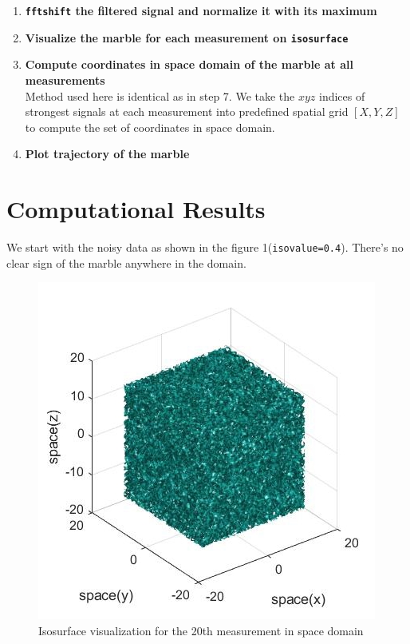 \documentclass[11pt,a4paper]{article}
\numberwithin{equation}{subsection}
\begin{document}
\begin{enumerate}
		\item \textbf{\texttt{fftshift} the filtered signal and normalize it with its maximum}
		
		\item \textbf{Visualize the marble for each measurement on \texttt{isosurface}}
		
		\item \textbf{Compute coordinates in space domain of the marble at all measurements}
		\\ Method used here is identical as in step 7. We take the $xyz$ indices of strongest signals at each measurement into predefined spatial grid $[X, Y, Z]$ to compute the set of coordinates in space domain.
		
		\item \textbf{Plot trajectory of the marble}
	\end{enumerate}


\section{Computational Results}
We start with the noisy data as shown in the figure 1(\texttt{isovalue=0.4}). There's no clear sign of the marble anywhere in the domain.\\

	\begin{figure}[H]
		\begin{center}
			\includegraphics[scale=0.60]{Figure1.jpg}
			\caption{Isosurface visualization for the 20th measurement in space domain}
		\end{center}
	\end{figure}
\end{document}
